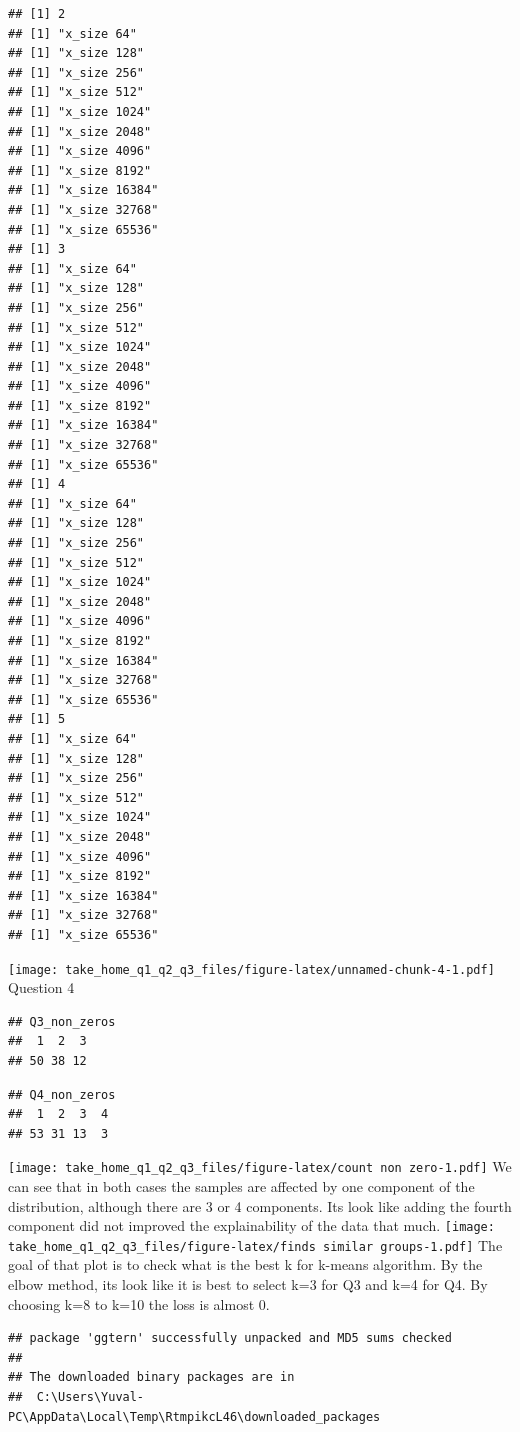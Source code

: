 \documentclass[
]{article}
\begin{document}
\begin{verbatim}
## [1] 2
## [1] "x_size 64"
## [1] "x_size 128"
## [1] "x_size 256"
## [1] "x_size 512"
## [1] "x_size 1024"
## [1] "x_size 2048"
## [1] "x_size 4096"
## [1] "x_size 8192"
## [1] "x_size 16384"
## [1] "x_size 32768"
## [1] "x_size 65536"
## [1] 3
## [1] "x_size 64"
## [1] "x_size 128"
## [1] "x_size 256"
## [1] "x_size 512"
## [1] "x_size 1024"
## [1] "x_size 2048"
## [1] "x_size 4096"
## [1] "x_size 8192"
## [1] "x_size 16384"
## [1] "x_size 32768"
## [1] "x_size 65536"
## [1] 4
## [1] "x_size 64"
## [1] "x_size 128"
## [1] "x_size 256"
## [1] "x_size 512"
## [1] "x_size 1024"
## [1] "x_size 2048"
## [1] "x_size 4096"
## [1] "x_size 8192"
## [1] "x_size 16384"
## [1] "x_size 32768"
## [1] "x_size 65536"
## [1] 5
## [1] "x_size 64"
## [1] "x_size 128"
## [1] "x_size 256"
## [1] "x_size 512"
## [1] "x_size 1024"
## [1] "x_size 2048"
## [1] "x_size 4096"
## [1] "x_size 8192"
## [1] "x_size 16384"
## [1] "x_size 32768"
## [1] "x_size 65536"
\end{verbatim}

\texttt{[image: take\_home\_q1\_q2\_q3\_files/figure-latex/unnamed-chunk-4-1.pdf]}
Question 4

\begin{verbatim}
## Q3_non_zeros
##  1  2  3 
## 50 38 12
\end{verbatim}

\begin{verbatim}
## Q4_non_zeros
##  1  2  3  4 
## 53 31 13  3
\end{verbatim}

\texttt{[image: take\_home\_q1\_q2\_q3\_files/figure-latex/count non zero-1.pdf]}
We can see that in both cases the samples are affected by one component
of the distribution, although there are 3 or 4 components. Its look like
adding the fourth component did not improved the explainability of the
data that much.
\texttt{[image: take\_home\_q1\_q2\_q3\_files/figure-latex/finds similar groups-1.pdf]}
The goal of that plot is to check what is the best k for k-means
algorithm. By the elbow method, its look like it is best to select k=3
for Q3 and k=4 for Q4. By choosing k=8 to k=10 the loss is almost 0.

\begin{verbatim}
## package 'ggtern' successfully unpacked and MD5 sums checked
## 
## The downloaded binary packages are in
##  C:\Users\Yuval-PC\AppData\Local\Temp\RtmpikcL46\downloaded_packages
\end{verbatim}
\end{document}
